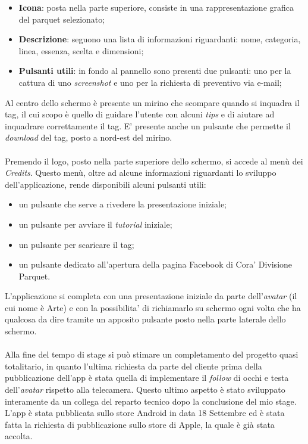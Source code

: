 \begin{itemize}
	\item \textbf{Icona}: posta nella parte superiore, consiste in una rappresentazione grafica del parquet selezionato;
	\item \textbf{Descrizione}: seguono una lista di informazioni riguardanti: nome, categoria, linea, essenza, scelta e dimensioni;
	\item \textbf{Pulsanti utili}: in fondo al pannello sono presenti due pulsanti: uno per la cattura di uno \textit{screenshot} e uno per la richiesta di preventivo via e-mail;
\end{itemize}
\noindent
Al centro dello schermo \`e presente un mirino che scompare quando si inquadra il tag, il cui scopo \`e quello di guidare l'utente con alcuni \textit{tips} e di aiutare ad inquadrare correttamente il tag. E' presente anche un pulsante che permette il \textit{download} del tag, posto a nord-est del mirino.\\\\

Premendo il logo, posto nella parte superiore dello schermo, si accede al men\`u dei \textit{Credits}. Questo men\`u, oltre ad alcune informazioni riguardanti lo sviluppo dell'applicazione, rende disponibili alcuni pulsanti utili:

\begin{itemize}
	\item un pulsante che serve a rivedere la presentazione iniziale;
	\item un pulsante per avviare il \textit{tutorial} iniziale;
	\item un pulsante per scaricare il tag;
	\item un pulsante dedicato all'apertura della pagina Facebook di Cora' Divisione Parquet.
\end{itemize}

L'applicazione si completa con una presentazione iniziale da parte dell'\textit{avatar\gloss} (il cui nome \`e Arte) e con la possibilita' di richiamarlo su schermo ogni volta che ha qualcosa da dire tramite un apposito pulsante posto nella parte laterale dello schermo.\\\\

\noindent
Alla fine del tempo di stage si pu\`o stimare un completamento del progetto quasi totalitario, in quanto l'ultima richiesta da parte del cliente prima della pubblicazione dell'app \`e stata quella di implementare il \textit{follow} di occhi e testa dell'\textit{avatar\gloss} rispetto alla telecamera. Questo ultimo aspetto \`e stato sviluppato interamente da un collega del reparto tecnico dopo la conclusione del mio stage.\\
L'app \`e stata pubblicata sullo store Android in data 18 Settembre ed \`e stata fatta la richiesta di pubblicazione sullo store di Apple, la quale \`e gi\`a stata accolta.
